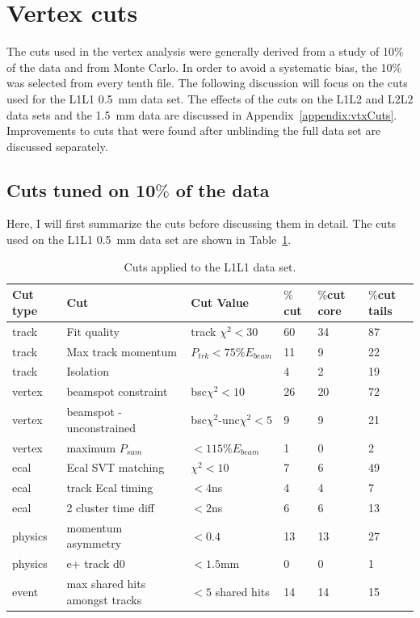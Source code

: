 
\section{Vertex cuts}
The cuts used in the vertex analysis were generally derived from a study of 10$\%$ of the data and from Monte Carlo. In order to avoid a systematic bias, the 10$\%$ was selected from every tenth file. The following discussion will focus on the cuts used for the L1L1 0.5~mm data set. The effects of the cuts on the L1L2 and L2L2 data sets and the 1.5~mm data are discussed in Appendix~\ref{appendix:vtxCuts}. Improvements to cuts that were found after unblinding the full data set are discussed separately.\\ 

\subsection{Cuts tuned on 10$\%$ of the data}
Here, I will first summarize the cuts before discussing them in detail. The cuts used on the L1L1 0.5~mm data set are shown in Table~\ref{tab:l1l1_cuts}.

\begin{table}[htb]
\caption{Cuts applied to the L1L1 data set.}
\label{tab:l1l1_cuts}
\centering
\begin{tabular}{llllll}
\toprule
Cut type & Cut & Cut Value &  $\%$cut &  $\%$cut core & $\%$cut tails\\
\midrule
track & Fit quality & track $\chi^{2}<30$ & 60 & 34 & 87 \\
track & Max track momentum &  $P_{trk}<75\%E_{beam}$ & 11 & 9 & 22 \\
track & Isolation &   & 4 & 2 & 19 \\
vertex & beamspot constraint & bsc$\chi^{2}<10$  & 26 & 20 & 72 \\
vertex & beamspot - unconstrained & bsc$\chi^{2}$-unc$\chi^2<5$  & 9 & 9 & 21 \\
vertex & maximum $P_{sum}$ &  $<115\%E_{beam}$ & 1 & 0 & 2 \\
ecal & Ecal SVT matching & $\chi^2<10$  & 7 & 6 & 49 \\
ecal & track Ecal timing & $<4$ns  & 4 & 4 & 7 \\
ecal & 2 cluster time diff & $<2$ns  & 6 & 6 & 13 \\
physics & momentum asymmetry & $<0.4$  & 13 & 13 & 27 \\
physics & e+ track d0 & $<1.5$mm  & 0 & 0 & 1 \\
event & max shared hits amongst tracks & $<5$ shared hits  & 14 & 14 & 15 \\
\bottomrule
\end{tabular}
\end{table}


